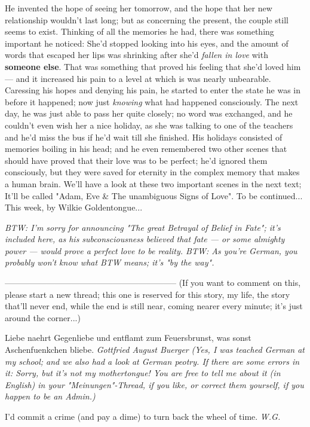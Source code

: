He invented the hope of seeing her tomorrow, and the hope that her new relationship wouldn't last long; but as concerning the present, the couple still seems to exist. 
Thinking of all the memories he had, there was something important he noticed: She'd stopped looking into his eyes, and the amount of words that escaped her lips was shrinking after she'd \emph{fallen in love} with \textbf{someone else}. That was something that proved his feeling that she'd loved him --- and it increased his pain to a level at which is was nearly unbearable. 
Caressing his hopes and denying his pain, he started to enter the state he was in before it happened; now just \emph{knowing} what had happened consciously. 
The next day, he was just able to pass her quite closely; no word was exchanged, and he couldn't even wish her a nice holiday, as she was talking to one of the teachers and he'd miss the bus if he'd wait till she finished. 
His holidays consisted of memories boiling in his head; and he even remembered two other scenes that should have proved that their love was to be perfect; he'd ignored them consciously, but they were saved for eternity in the complex memory that makes a human brain. 
We'll have a look at these two important scenes in the next text; It'll be called "Adam, Eve \& The unambiguous Signs of Love".
To be continued...
This week, by Wilkie Goldentongue...

\emph{
BTW: I'm sorry for announcing "The great Betrayal of Belief in Fate"; it's included here, as his subconsciousness believed that fate --- or some almighty power --- would prove a perfect love to be reality. 
BTW: As you're German, you probably won't know what BTW means; it's "by the way". 
}

--------------------------------------------------------------
(If you want to comment on this, please start a new thread; this one is reserved for this story, my life, the story that'll never end, while the end is still near, coming nearer every minute; it's just around the corner...)

Liebe naehrt Gegenliebe und entflamt zum Feuersbrunst, was sonst Aschenfuenkchen bliebe. 
\emph{Gottfried August Buerger}
\emph{(Yes, I was teached German at my school; and we also had a look at German peotry. If there are some errors in it: Sorry, but it's not my mothertongue! You are free to tell me about it (in English) in your "Meinungen"-Thread, if you like, or correct them yourself, if you happen to be an Admin.)}

I'd commit a crime (and pay a dime)
to turn back the wheel of time.
\emph{W.G.}
